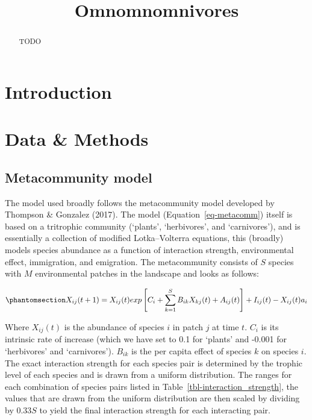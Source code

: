 \documentclass[
]{agujournal2019}
\begin{document}
\title{Omnomnomnivores}



\begin{abstract}
TODO
\end{abstract}




\section{Introduction}\label{introduction}

\section{Data \& Methods}\label{sec-data-methods}

\subsection{Metacommunity model}\label{metacommunity-model}

The model used broadly follows the metacommunity model developed by
Thompson \& Gonzalez (2017). The model (Equation~\ref{eq-metacomm})
itself is based on a tritrophic community (`plants', `herbivores', and
`carnivores'), and is essentially a collection of modified
Lotka--Volterra equations, this (broadly) models species abundance as a
function of interaction strength, environmental effect, immigration, and
emigration. The metacommunity consists of \(S\) species with \(M\)
environmental patches in the landscape and looks as follows:

\begin{equation}\phantomsection\label{eq-metacomm}{
X_{ij}(t+1)=X_{ij}(t)exp\left[C_{i} + \sum_{k=1}^{S}B_{ik}X_{kj}(t)+A_{ij}(t)\right]+I_{ij}(t)-X_{ij}(t)a_{i}
}\end{equation}

Where \(X_{ij}(t)\) is the abundance of species \(i\) in patch \(j\) at
time \(t\). \(C_i\) is its intrinsic rate of increase (which we have set
to 0.1 for `plants' and -0.001 for `herbivores' and `carnivores').
\(B_{ik}\) is the per capita effect of species \(k\) on species \(i\).
The exact interaction strength for each species pair is determined by
the trophic level of each species and is drawn from a uniform
distribution. The ranges for each combination of species pairs listed in
Table~\ref{tbl-interaction_strength}, the values that are drawn from the
uniform distribution are then scaled by dividing by \(0.33S\) to yield
the final interaction strength for each interacting pair.
\end{document}
